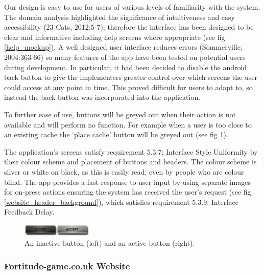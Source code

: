 Our design is easy to use for users of various levels of familiarity with the system. The domain analysis highlighted the significance of intuitiveness and easy accessibility (23 Cats, 2012:5-7); therefore the interface has been designed to be clear and informative including help screens where appropriate (see fig \ref{help_mockup}). A well designed user interface reduces errors (Sommerville, 2004:363-66) so many features of the app have been tested on potential users during development. In particular, it had been decided to disable the android back button to give the implementers greater control over which screens the user could access at any point in time. This proved difficult for users to adapt to, so instead the back button was incorporated into the application.

To further ease of use, buttons will be greyed out when their action is not available and will perform no function. For example when a user is too close to an existing cache the `place cache' button will be greyed out (see fig \ref{buttons}).

The application's screens satisfy requirement 5.3.7: Interface Style Uniformity by their colour scheme and placement of buttons and headers. The colour scheme is silver or white on black, as this is easily read, even by people who are colour blind. The app provides a fast response to user input by using separate images for on-press actions ensuring the system has received the user's request (see fig \ref{website_header_background}), which satisfies requirement 5.3.9: Interface Feedback Delay.

\begin{figure}[ht]
	\vspace{-10pt}
	\begin{center}
	\includegraphics[width=0.3\textwidth]{images/buttons}
	\vspace{-10pt}
	\caption{An inactive button (left) and an active button (right).}
	\label{buttons}
	\end{center}
\end{figure}

\subsubsection{Fortitude-game.co.uk Website}

